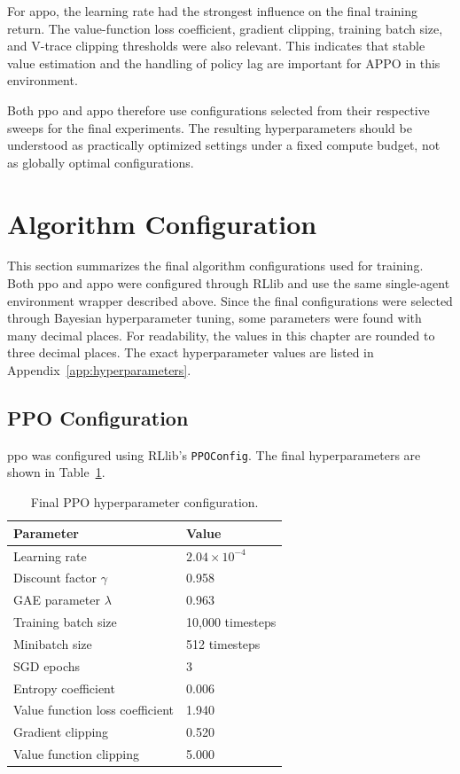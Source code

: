 \documentclass[english,bachelor]{hsluthesis}
\begin{document}
For \gls{appo}, the learning rate had the strongest influence on the final training return. The value-function loss coefficient, gradient clipping, training batch size, and V-trace clipping thresholds were also relevant. This indicates that stable value estimation and the handling of policy lag are important for APPO in this environment.

Both \gls{ppo} and \gls{appo} therefore use configurations selected from their respective sweeps for the final experiments. The resulting hyperparameters should be understood as practically optimized settings under a fixed compute budget, not as globally optimal configurations.

\section{Algorithm Configuration}

This section summarizes the final algorithm configurations used for training. Both \gls{ppo} and \gls{appo} were configured through RLlib and use the same single-agent environment wrapper described above. Since the final configurations were selected through Bayesian hyperparameter tuning, some parameters were found with many decimal places. For readability, the values in this chapter are rounded to three decimal places. The exact hyperparameter values are listed in Appendix~\ref{app:hyperparameters}.

\subsection{PPO Configuration}

\gls{ppo} was configured using RLlib's \texttt{PPOConfig}. The final hyperparameters are shown in Table~\ref{tab:ppo_hyperparams}.

\begin{table}[H]
\centering
\begin{tabular}{l l}
\hline
Parameter & Value \\
\hline
Learning rate & $2.04 \times 10^{-4}$ \\
Discount factor $\gamma$ & 0.958 \\
GAE parameter $\lambda$ & 0.963 \\
Training batch size & 10,000 timesteps \\
Minibatch size & 512 timesteps \\
SGD epochs & 3 \\
Entropy coefficient & 0.006 \\
Value function loss coefficient & 1.940 \\
Gradient clipping & 0.520 \\
Value function clipping & 5.000 \\
\hline
\end{tabular}
\caption{Final PPO hyperparameter configuration.}
\label{tab:ppo_hyperparams}
\end{table}
\end{document}
